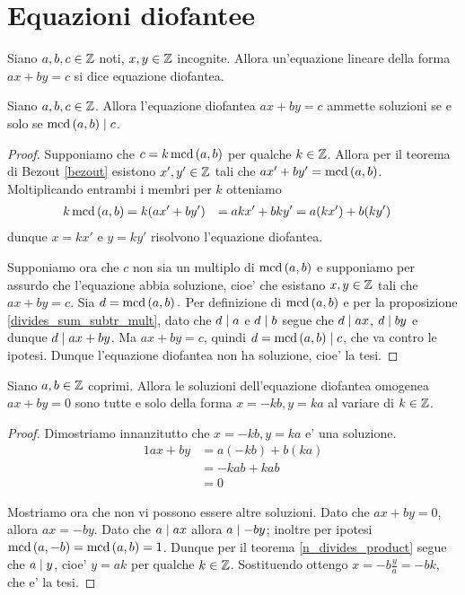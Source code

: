 \section{Equazioni diofantee}

\begin{definition}
    Siano $a, b, c \in \mathbb{Z}$ noti, $x, y \in \mathbb{Z}$ incognite. Allora un'equazione
    lineare della forma $ax + by = c$ si dice equazione diofantea.
\end{definition}

\begin{theorem}
    Siano $a, b, c \in \mathbb{Z}$. Allora l'equazione diofantea $ax + by = c$ ammette soluzioni
    se e solo se $\operatorname{mcd}\left(a, b\right) \mid c$.
\end{theorem}
\begin{proof}
    Supponiamo che $c = k\operatorname{mcd}\left(a, b\right)$ per qualche $k \in \mathbb{Z}$. Allora per il teorema di Bezout
    \ref{bezout} esistono $x', y' \in \mathbb{Z}$ tali che $ax' + by' = \operatorname{mcd}\left(a, b\right)$. Moltiplicando
    entrambi i membri per $k$ otteniamo
    \begin{alignat*}{2} 
        k\operatorname{mcd}\left(a, b\right) &= k(ax' + by')
                    &= akx' + bky'
                    &= a(kx') + b(ky')
    \end{alignat*}
    dunque $x = kx'$ e $y = ky'$ risolvono l'equazione diofantea.

    Supponiamo ora che $c$ non sia un multiplo di $\operatorname{mcd}\left(a, b\right)$ e supponiamo per assurdo che l'equazione
    abbia soluzione, cioe' che esistano $x, y \in \mathbb{Z}$ tali che $ax + by = c$. Sia $d = \operatorname{mcd}\left(a, b\right).$
    Per definizione di $\operatorname{mcd}\left(a, b\right)$ e per la proposizione \ref{divides_sum_subtr_mult},
    dato che $d \mid a$ e $d \mid b$ segue che $d \mid ax$, $d \mid by$ e dunque
    $d \mid ax + by$. Ma $ax + by = c$, quindi $d = \operatorname{mcd}\left(a, b\right) \mid c$, che va contro le ipotesi.
    Dunque l'equazione diofantea non ha soluzione, cioe' la tesi.
\end{proof}

\begin{theorem} \label{sol_diofantea_omogenea_coprimi}
    Siano $a, b \in \mathbb{Z}$ coprimi. Allora le soluzioni dell'equazione diofantea omogenea $ax + by = 0$ 
    sono tutte e solo della forma $x = -kb, y = ka$ al variare di $k \in \mathbb{Z}$.
\end{theorem}
\begin{proof}
    Dimostriamo innanzitutto che $x = -kb, y = ka$ e' una soluzione.
    \begin{alignat*}{1}
        ax + by &= a(-kb) + b(ka)\\
                &= -kab + kab\\
                &= 0
    \end{alignat*}

    Mostriamo ora che non vi possono essere altre soluzioni. Dato che $ax + by = 0$, allora $ax = -by$.
    Dato che $a \mid ax$ allora $a \mid -by$; inoltre per ipotesi $\operatorname{mcd}\left(a, -b\right) = \operatorname{mcd}\left(a, b\right) = 1$.
    Dunque per il teorema \ref{n_divides_product} segue che $a \mid y$, cioe' $y = ak$ per
    qualche $k \in \mathbb{Z}$. Sostituendo ottengo $x = -b\frac{y}{a} = -bk$, che e' la tesi.
\end{proof}

